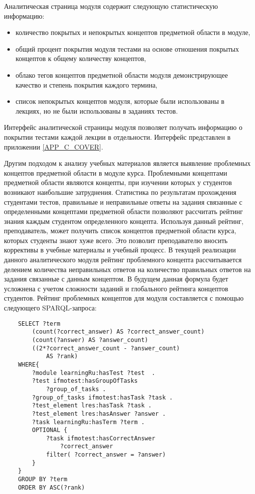 Аналитическая страница модуля содержит следующую статистическую информацию:

\begin{itemize}
\item количество покрытых и непокрытых концептов предметной области в модуле,
\item общий процент покрытия модуля тестами на основе отношения покрытых концептов к общему количеству концептов,
\item облако тегов концептов предметной области модуля демонстрирующее качество и степень покрытия каждого термина,
\item список непокрытых концептов модуля, которые были использованы в лекциях, но не были использованы в заданиях тестов.   
\end{itemize}

Интерфейс аналитической страницы модуля позволяет получать информацию о покрытии тестами каждой лекции в отдельности. Интерфейс представлен в приложении \ref{APP_C_COVER}.


Другим подходом к анализу учебных материалов является выявление проблемных  концептов предметной области в модуле курса. Проблемными концептами предметной области являются концепты, при изучении которых у студентов возникают наибольшие затруднения. Статистика по результатам прохождения студентами тестов, правильные и неправильные ответы на задания связанные с определенными концептами предметной области позволяют рассчитать рейтинг знания каждым студентом определенного концепта. Используя данный рейтинг, преподаватель, может получить список концептов предметной области курса, которых студенты знают хуже всего. Это позволит преподавателю вносить коррективы в учебные материалы и учебный процесс. В текущей реализации данного аналитического модуля рейтинг проблемного концепта рассчитывается делением количества неправильных ответов на количество правильных ответов на задания связанные с данным концептом. В будущем данная формула будет усложнена с учетом сложности заданий и глобального рейтинга концептов студентов. Рейтинг проблемных концептов для модуля составляется с помощью следующего  SPARQL-запроса:

\begin{verbatim}
    SELECT ?term 
        (count(?correct_answer) AS ?correct_answer_count)
        (count(?answer) AS ?answer_count)
        ((2*?correct_answer_count - ?answer_count) 
            AS ?rank) 
    WHERE{
        ?module learningRu:hasTest ?test  . 
        ?test ifmotest:hasGroupOfTasks 
            ?group_of_tasks .        
        ?group_of_tasks ifmotest:hasTask ?task .      
        ?test_element lres:hasTask ?task .
        ?test_element lres:hasAnswer ?answer .
        ?task learningRu:hasTerm ?term .       
        OPTIONAL { 
            ?task ifmotest:hasCorrectAnswer 
                ?correct_answer
            filter( ?correct_answer = ?answer)
        }         
    }
    GROUP BY ?term 
    ORDER BY ASC(?rank)
\end{verbatim}

